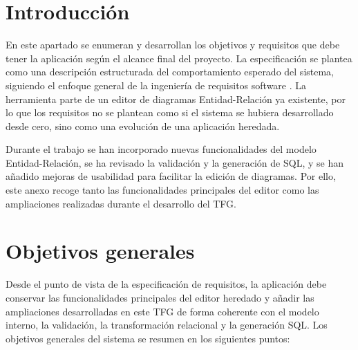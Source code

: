 
\section{Introducción}

En este apartado se enumeran y desarrollan los objetivos y requisitos que debe tener la aplicación según el alcance final del proyecto. La especificación se plantea como una descripción estructurada del comportamiento esperado del sistema, siguiendo el enfoque general de la ingeniería de requisitos software \cite{iso29148}. La herramienta parte de un editor de diagramas Entidad-Relación ya existente, por lo que los requisitos no se plantean como si el sistema se hubiera desarrollado desde cero, sino como una evolución de una aplicación heredada.


Durante el trabajo se han incorporado nuevas funcionalidades del modelo Entidad-Relación, se ha revisado la validación y la generación de SQL, y se han añadido mejoras de usabilidad para facilitar la edición de diagramas. Por ello, este anexo recoge tanto las funcionalidades principales del editor como las ampliaciones realizadas durante el desarrollo del TFG.

\section{Objetivos generales}

Desde el punto de vista de la especificación de requisitos, la aplicación debe conservar las funcionalidades principales del editor heredado y añadir las ampliaciones desarrolladas en este TFG de forma coherente con el modelo interno, la validación, la transformación relacional y la generación SQL. Los objetivos generales del sistema se resumen en los siguientes puntos:


